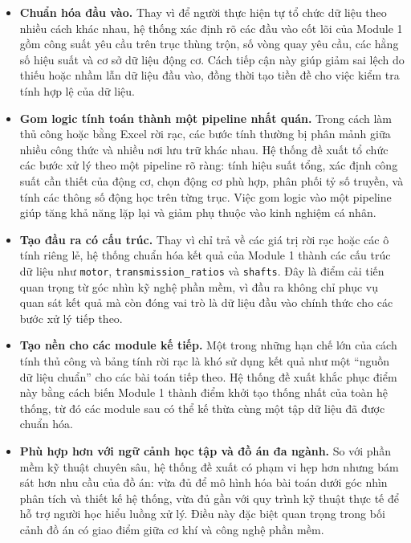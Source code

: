 \documentclass[a4paper]{article}
\begin{document}
\begin{itemize}
\item \textbf{Chuẩn hóa đầu vào.} Thay vì để người thực hiện tự tổ chức dữ liệu theo nhiều cách khác nhau, hệ thống xác định rõ các đầu vào cốt lõi của Module 1 gồm công suất yêu cầu trên trục thùng trộn, số vòng quay yêu cầu, các hằng số hiệu suất và cơ sở dữ liệu động cơ. Cách tiếp cận này giúp giảm sai lệch do thiếu hoặc nhầm lẫn dữ liệu đầu vào, đồng thời tạo tiền đề cho việc kiểm tra tính hợp lệ của dữ liệu.

\item \textbf{Gom logic tính toán thành một pipeline nhất quán.} Trong cách làm thủ công hoặc bằng Excel rời rạc, các bước tính thường bị phân mảnh giữa nhiều công thức và nhiều nơi lưu trữ khác nhau. Hệ thống đề xuất tổ chức các bước xử lý theo một pipeline rõ ràng: tính hiệu suất tổng, xác định công suất cần thiết của động cơ, chọn động cơ phù hợp, phân phối tỷ số truyền, và tính các thông số động học trên từng trục. Việc gom logic vào một pipeline giúp tăng khả năng lặp lại và giảm phụ thuộc vào kinh nghiệm cá nhân.

\item \textbf{Tạo đầu ra có cấu trúc.} Thay vì chỉ trả về các giá trị rời rạc hoặc các ô tính riêng lẻ, hệ thống chuẩn hóa kết quả của Module 1 thành các cấu trúc dữ liệu như \texttt{motor}, \texttt{transmission\_ratios} và \texttt{shafts}. Đây là điểm cải tiến quan trọng từ góc nhìn kỹ nghệ phần mềm, vì đầu ra không chỉ phục vụ quan sát kết quả mà còn đóng vai trò là dữ liệu đầu vào chính thức cho các bước xử lý tiếp theo.

\item \textbf{Tạo nền cho các module kế tiếp.} Một trong những hạn chế lớn của cách tính thủ công và bảng tính rời rạc là khó sử dụng kết quả như một ``nguồn dữ liệu chuẩn'' cho các bài toán tiếp theo. Hệ thống đề xuất khắc phục điểm này bằng cách biến Module 1 thành điểm khởi tạo thống nhất của toàn hệ thống, từ đó các module sau có thể kế thừa cùng một tập dữ liệu đã được chuẩn hóa.

\item \textbf{Phù hợp hơn với ngữ cảnh học tập và đồ án đa ngành.} So với phần mềm kỹ thuật chuyên sâu, hệ thống đề xuất có phạm vi hẹp hơn nhưng bám sát hơn nhu cầu của đồ án: vừa đủ để mô hình hóa bài toán dưới góc nhìn phân tích và thiết kế hệ thống, vừa đủ gần với quy trình kỹ thuật thực tế để hỗ trợ người học hiểu luồng xử lý. Điều này đặc biệt quan trọng trong bối cảnh đồ án có giao điểm giữa cơ khí và công nghệ phần mềm.
\end{itemize}
\end{document}
